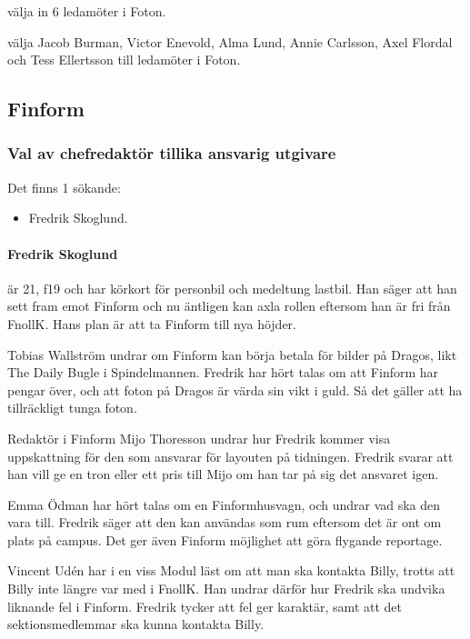 \documentclass[hidelinks]{sektionsmote}
\begin{document}
\begin{beslut}
  \item välja in 6 ledamöter i Foton.
  \item välja Jacob Burman, Victor Enevold, Alma Lund, Annie Carlsson, Axel Flordal och Tess Ellertsson till ledamöter i Foton.
\end{beslut}


\subsection{Finform}
\subsubsection{Val av chefredaktör tillika ansvarig utgivare}
Det finns 1 sökande:
\begin{itemize}
    \item Fredrik Skoglund.
\end{itemize}

\paragraph{Fredrik Skoglund} är 21, f19 och har körkort för personbil och medeltung lastbil.
Han säger att han sett fram emot Finform och nu äntligen kan axla rollen eftersom han är fri från FnollK.
Hans plan är att ta Finform till nya höjder.

Tobias Wallström undrar om Finform kan börja betala för bilder på Dragos, likt The Daily Bugle i Spindelmannen.
Fredrik har hört talas om att Finform har pengar över, och att foton på Dragos är värda sin vikt i guld.
Så det gäller att ha tillräckligt tunga foton.

Redaktör i Finform Mijo Thoresson undrar hur Fredrik kommer visa uppskattning för den som ansvarar för layouten på tidningen.
Fredrik svarar att han vill ge en tron eller ett pris till Mijo om han tar på sig det ansvaret igen.

Emma Ödman har hört talas om en Finformhusvagn, och undrar vad ska den vara till.
Fredrik säger att den kan användas som rum eftersom det är ont om plats på campus.
Det ger även Finform möjlighet att göra flygande reportage.

Vincent Udén har i en viss Modul läst om att man ska kontakta Billy, trotts att Billy inte längre var med i FnollK.
Han undrar därför hur Fredrik ska undvika liknande fel i Finform.
Fredrik tycker att fel ger karaktär, samt att det sektionsmedlemmar ska kunna kontakta Billy.
\end{document}

